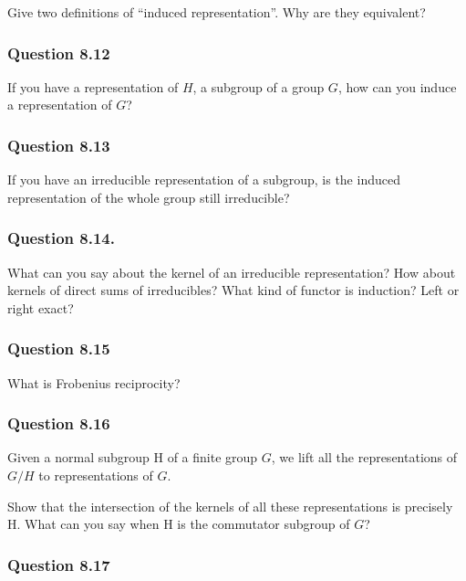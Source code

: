 Give two definitions of ``induced representation''. Why are they
equivalent?

\hypertarget{question-8.12}{%
\subsubsection{Question 8.12}\label{question-8.12}}

If you have a representation of \(H\), a subgroup of a group \(G\), how
can you induce a representation of \(G\)?

\hypertarget{question-8.13}{%
\subsubsection{Question 8.13}\label{question-8.13}}

If you have an irreducible representation of a subgroup, is the induced
representation of the whole group still irreducible?

\hypertarget{question-8.14.}{%
\subsubsection{Question 8.14.}\label{question-8.14.}}

What can you say about the kernel of an irreducible representation? How
about kernels of direct sums of irreducibles? What kind of functor is
induction? Left or right exact?

\hypertarget{question-8.15}{%
\subsubsection{Question 8.15}\label{question-8.15}}

What is Frobenius reciprocity?

\hypertarget{question-8.16}{%
\subsubsection{Question 8.16}\label{question-8.16}}

Given a normal subgroup H of a finite group \(G\), we lift all the
representations of \(G/H\) to representations of \(G\).

Show that the intersection of the kernels of all these representations
is precisely H. What can you say when H is the commutator subgroup of
\(G\)?

\hypertarget{question-8.17}{%
\subsubsection{Question 8.17}\label{question-8.17}}

